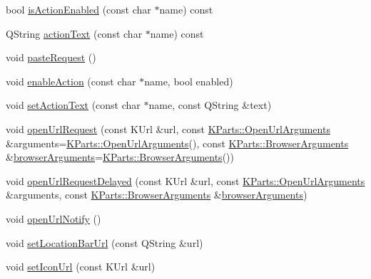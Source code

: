 \begin{DoxyCompactItemize}
\item 
bool \hyperlink{classKParts_1_1BrowserExtension_a28ba7afad45aa10823156627012a8fdb}{is\-Action\-Enabled} (const char $\ast$name) const 
\item 
\-Q\-String \hyperlink{classKParts_1_1BrowserExtension_a3679c7a2a8b77b9f8afec49393eea1d5}{action\-Text} (const char $\ast$name) const 
\item 
void \hyperlink{classKParts_1_1BrowserExtension_ae6ee41fff23065d6d40e06247feae6e2}{paste\-Request} ()
\item 
void \hyperlink{classKParts_1_1BrowserExtension_a3252f2adebd103519ee15e57037c7386}{enable\-Action} (const char $\ast$name, bool enabled)
\item 
void \hyperlink{classKParts_1_1BrowserExtension_a73506e6a8b89d661512d4a6dfcfaabd5}{set\-Action\-Text} (const char $\ast$name, const \-Q\-String \&text)
\item 
void \hyperlink{classKParts_1_1BrowserExtension_ac58ebde72bd36f1bfc189ea3ccf05a07}{open\-Url\-Request} (const \-K\-Url \&url, const \hyperlink{classKParts_1_1OpenUrlArguments}{\-K\-Parts\-::\-Open\-Url\-Arguments} \&arguments=\hyperlink{classKParts_1_1OpenUrlArguments}{\-K\-Parts\-::\-Open\-Url\-Arguments}(), const \hyperlink{structKParts_1_1BrowserArguments}{\-K\-Parts\-::\-Browser\-Arguments} \&\hyperlink{classKParts_1_1BrowserExtension_a8bd50c2c5bd6b43d15c4af157977cc42}{browser\-Arguments}=\hyperlink{structKParts_1_1BrowserArguments}{\-K\-Parts\-::\-Browser\-Arguments}())
\item 
void \hyperlink{classKParts_1_1BrowserExtension_a8556e230ec679f8b2ddfde63c3039428}{open\-Url\-Request\-Delayed} (const \-K\-Url \&url, const \hyperlink{classKParts_1_1OpenUrlArguments}{\-K\-Parts\-::\-Open\-Url\-Arguments} \&arguments, const \hyperlink{structKParts_1_1BrowserArguments}{\-K\-Parts\-::\-Browser\-Arguments} \&\hyperlink{classKParts_1_1BrowserExtension_a8bd50c2c5bd6b43d15c4af157977cc42}{browser\-Arguments})
\item 
void \hyperlink{classKParts_1_1BrowserExtension_a06b1ae0f0712677310ff7bc0b31b376a}{open\-Url\-Notify} ()
\item 
void \hyperlink{classKParts_1_1BrowserExtension_a335b6f5c78db67e7b8d385eb313b8aef}{set\-Location\-Bar\-Url} (const \-Q\-String \&url)
\item 
void \hyperlink{classKParts_1_1BrowserExtension_aded24c62c57a7768f54c852831f4fd30}{set\-Icon\-Url} (const \-K\-Url \&url)
\item 

\end{DoxyCompactItemize}
